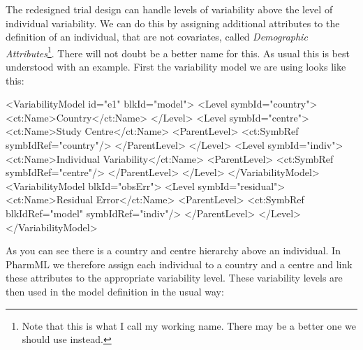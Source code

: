 \documentclass[a4paper,10pt]{article}
\newcommand{\watchout}{\marginpar{\hspace*{34pt}\raisebox{-0.5ex}{\Large\ding{43}}}}
\begin{document}
\watchout The redesigned trial design can handle levels of variability above the
level of individual variability. We can do this by assigning
additional attributes to the definition of an individual, that are not
covariates, called \emph{Demographic Attributes}\footnote{Note that
  this is what I call my working name. There may be a better one we
  should use instead.}. There will not doubt be a better name for
this. As usual this is best understood with an example. First the
variability model we are using looks like this:
%
\begin{xmlcode}
<VariabilityModel id="e1" blkId="model">
    <Level symbId="country">
        <ct:Name>Country</ct:Name>
    </Level>
    <Level symbId="centre">
        <ct:Name>Study Centre</ct:Name>
        <ParentLevel>
            <ct:SymbRef symbIdRef="country"/>
        </ParentLevel>
    </Level>
    <Level symbId="indiv">
        <ct:Name>Individual Variability</ct:Name>
        <ParentLevel>
            <ct:SymbRef symbIdRef="centre"/>
        </ParentLevel>
    </Level>
</VariabilityModel>
<VariabilityModel blkId="obsErr">
    <Level symbId="residual">
        <ct:Name>Residual Error</ct:Name>
        <ParentLevel>
            <ct:SymbRef blkIdRef="model" symbIdRef="indiv"/>
        </ParentLevel>
    </Level>
</VariabilityModel>
\end{xmlcode}
%
As you can see there is a country and centre hierarchy above an
individual. In PharmML we therefore assign each individual to a
country and a centre and link these attributes to the appropriate
variability level. These variability levels are then used in the model
definition in the usual way:
%
\end{document}
